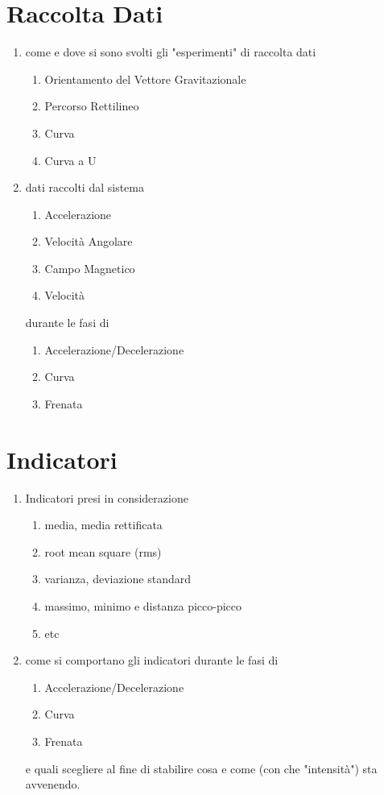 \documentclass[12pt]{article}
\begin{document}
	\newpage
	\section{Raccolta Dati}
	\begin{enumerate}
		\item come e dove si sono svolti gli "esperimenti" di raccolta dati
		\begin{enumerate}
			\item Orientamento del Vettore Gravitazionale
			\item Percorso Rettilineo
			\item Curva
			\item Curva a U
		\end{enumerate}		
		\item dati raccolti dal sistema
		\begin{enumerate}
			\item Accelerazione
			\item Velocità Angolare
			\item Campo Magnetico
			\item Velocità
		\end{enumerate}
		durante le fasi di
		\begin{enumerate}
			\item Accelerazione/Decelerazione
			\item Curva
			\item Frenata
		\end{enumerate}
	\end{enumerate}
	
	\newpage
	\section{Indicatori}
	\begin{enumerate}
		\item Indicatori presi in considerazione
		\begin{enumerate}
			\item media, media rettificata
			\item root mean square (rms)
			\item varianza, deviazione standard
			\item massimo, minimo e distanza picco-picco
			\item etc
		\end{enumerate}
		\item come si comportano gli indicatori durante le fasi di
		\begin{enumerate}
			\item Accelerazione/Decelerazione
			\item Curva
			\item Frenata
		\end{enumerate}
		e quali scegliere al fine di stabilire cosa e come (con che "intensità") sta avvenendo.
	\end{enumerate}
	
\end{document}
